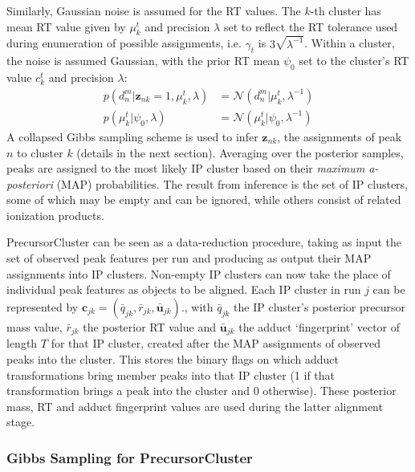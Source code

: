 Similarly, Gaussian noise is assumed for the RT values. The $k$-th cluster has mean RT value given by $\mu_k^t$ and precision $\lambda$ set to reflect the RT tolerance used during enumeration of possible assignments, i.e. $\gamma_t$ is $3\sqrt{\lambda^{-1}}$. Within a cluster, the noise is assumed Gaussian, with the prior RT mean $\psi_0$ set to the cluster's RT value $c_k^t$ and precision $\lambda$:
\begin{align}
p(d_n^m\vert\boldsymbol{z}_{nk}=1,\mu_k^t,\lambda) &= \mathcal{N}(d_n^m \vert \mu_k^t,\lambda^{-1}) \label{eq:rt-term-pc}\\
p(\mu_k^t\vert \psi_0,\lambda) &= \mathcal{N}(\mu_k^t \vert \psi_0,\lambda^{-1}) \label{eq:rt-prior-pc}
\end{align}
A collapsed Gibbs sampling scheme is used to infer $\boldsymbol{z}_{nk}$, the assignments of peak $n$ to cluster $k$ (details in the next section). Averaging over the posterior samples, peaks are assigned to the most likely IP cluster based on their \textit{maximum a-posteriori} (MAP) probabilities. The result from inference is the set of IP clusters, some of which may be empty and can be ignored, while others consist of related ionization products. 

PrecursorCluster can be seen as a data-reduction procedure, taking as input the set of observed peak features per run and producing as output their MAP assignments into IP clusters. Non-empty IP clusters can now take the place of individual peak features as objects to be aligned. Each IP cluster in run $j$ can be represented by $\boldsymbol{c}_{jk}=({\bar{q}}_{jk}, {\bar{r}}_{jk}, \boldsymbol{\bar{u}}_{jk})$., with ${\bar{q}}_{jk}$ the IP cluster's posterior precursor mass value, ${\bar{r}}_{jk}$ the posterior RT value and $\boldsymbol{\bar{u}}_{jk}$ the adduct `fingerprint' vector of length $T$ for that IP cluster, created after the MAP assignments of observed peaks into the cluster. This stores the binary flags on which adduct transformations bring member peaks into that IP cluster (1 if that transformation brings a peak into the cluster and 0 otherwise). These posterior mass, RT and adduct fingerprint values are used during the latter alignment stage.

\subsubsection{Gibbs Sampling for PrecursorCluster\label{sub:ip-clustering-gibbs}}

